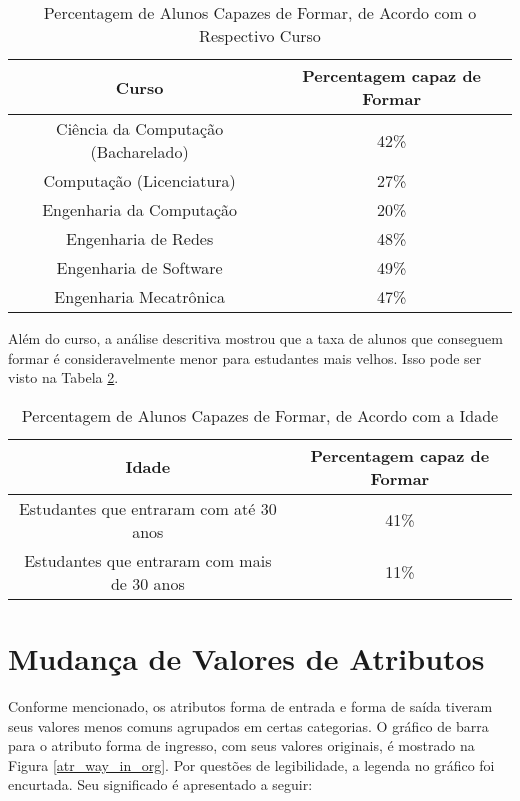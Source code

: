 \begin{table}
\begin{center}
\begin{tabular}[c]{| c | c |}
    \hline
    \textbf{Curso} & \textbf{Percentagem capaz de Formar} \\
    \hline
    Ciência da Computação (Bacharelado) & 42\% \\
    \hline
    Computação (Licenciatura) & 27\% \\
    \hline
    Engenharia da Computação & 20\% \\
    \hline
    Engenharia de Redes & 48\% \\
    \hline
    Engenharia de Software & 49\% \\
    \hline
    Engenharia Mecatrônica & 47\% \\
    \hline
\end{tabular}
\end{center}
\caption{Percentagem de Alunos Capazes de Formar, de Acordo com o Respectivo
    Curso}
\label{justificativa_4_curso}
\end{table}

\par Além do curso, a análise descritiva mostrou que a taxa de alunos que conseguem
formar é consideravelmente menor para estudantes mais velhos. Isso pode ser visto na
Tabela \ref{justificativa_4_idade}.

\begin{table}
\begin{center}
\begin{tabular}[c]{| c | c |}
    \hline
    \textbf{Idade} & \textbf{Percentagem capaz de Formar} \\
    \hline
    Estudantes que entraram com até 30 anos & 41\% \\
    \hline
    Estudantes que entraram com mais de 30 anos & 11\% \\
    \hline
\end{tabular}
\end{center}
\caption{Percentagem de Alunos Capazes de Formar, de Acordo com a Idade}
\label{justificativa_4_idade}
\end{table}

\section{Mudança de Valores de Atributos} \label{just_mud_atr}
Conforme mencionado, os atributos forma de entrada e forma de saída tiveram seus
valores menos comuns agrupados em certas categorias. O gráfico de barra para o
atributo forma de ingresso, com seus valores originais, é mostrado na Figura
\ref{atr_way_in_org}. 
Por questões de legibilidade, a legenda no gráfico foi encurtada. Seu significado é
apresentado a seguir: 

